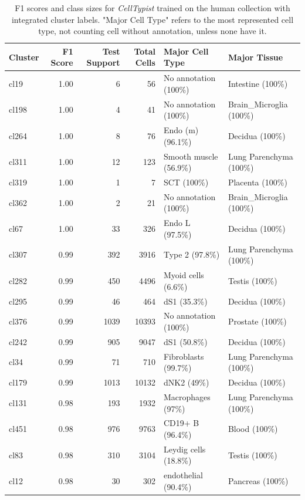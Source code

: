 \begin{table}[ht!]
\scriptsize
\caption[F1 scores and class sizes for \textit{CellTypist} trained on the human collection with integrated cluster labels]{F1 scores and class sizes for \textit{CellTypist} trained on the human collection with integrated cluster labels. "Major Cell Type" refers to the most represented cell type, not counting cell without annotation, unless none have it.}
\centering
\label{table:tab_HAmodelclust}
\begin{tabular}{lrrrll}
  \toprule
Cluster & F1 Score & Test Support & Total Cells & Major Cell Type & Major Tissue \\ 
  \midrule
cl19 & 1.00 &   6 &  56 & No annotation (100\%) & Intestine (100\%) \\ 
  cl198 & 1.00 &   4 &  41 & No annotation (100\%) & Brain\_Microglia (100\%) \\ 
  cl264 & 1.00 &   8 &  76 & Endo (m) (96.1\%) & Decidua (100\%) \\ 
  cl311 & 1.00 &  12 & 123 & Smooth muscle (56.9\%) & Lung Parenchyma (100\%) \\ 
  cl319 & 1.00 &   1 &   7 & SCT (100\%) & Placenta (100\%) \\ 
  cl362 & 1.00 &   2 &  21 & No annotation (100\%) & Brain\_Microglia (100\%) \\ 
  cl67 & 1.00 &  33 & 326 & Endo L (97.5\%) & Decidua (100\%) \\ 
  cl307 & 0.99 & 392 & 3916 & Type 2 (97.8\%) & Lung Parenchyma (100\%) \\ 
  cl282 & 0.99 & 450 & 4496 & Myoid cells (6.6\%) & Testis (100\%) \\ 
  cl295 & 0.99 &  46 & 464 & dS1 (35.3\%) & Decidua (100\%) \\ 
  cl376 & 0.99 & 1039 & 10393 & No annotation (100\%) & Prostate (100\%) \\ 
  cl242 & 0.99 & 905 & 9047 & dS1 (50.8\%) & Decidua (100\%) \\ 
  cl34 & 0.99 &  71 & 710 & Fibroblasts (99.7\%) & Lung Parenchyma (100\%) \\ 
  cl179 & 0.99 & 1013 & 10132 & dNK2 (49\%) & Decidua (100\%) \\ 
  cl131 & 0.98 & 193 & 1932 & Macrophages (97\%) & Lung Parenchyma (100\%) \\ 
  cl451 & 0.98 & 976 & 9763 & CD19+ B (96.4\%) & Blood (100\%) \\ 
  cl83 & 0.98 & 310 & 3104 & Leydig cells (18.8\%) & Testis (100\%) \\ 
  cl12 & 0.98 &  30 & 302 & endothelial (90.4\%) & Pancreas (100\%) \\ 

\end{tabular}
\end{table}
